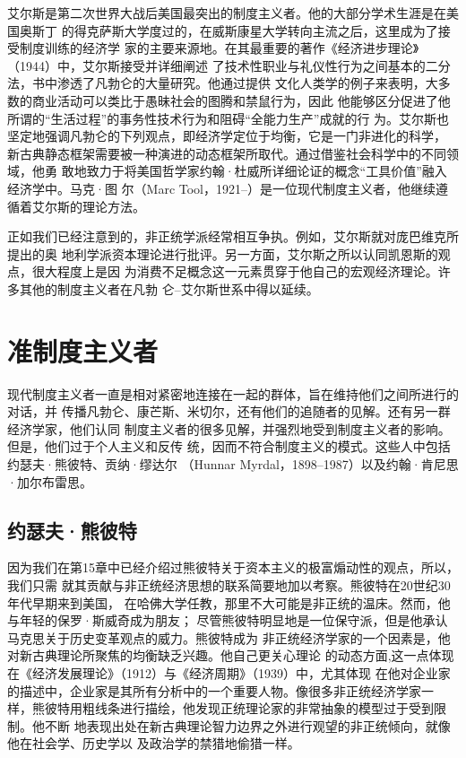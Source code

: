 艾尔斯是第二次世界大战后美国最突出的制度主义者。他的大部分学术生涯是在美国奥斯丁
的得克萨斯大学度过的，在威斯康星大学转向主流之后，这里成为了接受制度训练的经济学
家的主要来源地。在其最重要的著作《经济进步理论》（1944）中，艾尔斯接受并详细阐述
了技术性职业与礼仪性行为之间基本的二分法，书中渗透了凡勃仑的大量研究。他通过提供
文化人类学的例子来表明，大多数的商业活动可以类比于愚昧社会的图腾和禁鼠行为，因此
他能够区分促进了他所谓的“生活过程”的事务性技术行为和阻碍“全能力生产”成就的行
为。艾尔斯也坚定地强调凡勃仑的下列观点，即经济学定位于均衡，它是一门非进化的科学，
新古典静态框架需要被一种演进的动态框架所取代。通过借鉴社会科学中的不同领域，他勇
敢地致力于将美国哲学家约翰·杜威所详细论证的概念“工具价值”融入经济学中。马克·图
尔（Marc Tool，1921--）是一位现代制度主义者，他继续遵循着艾尔斯的理论方法。

正如我们已经注意到的，非正统学派经常相互争执。例如，艾尔斯就对庞巴维克所提出的奥
地利学派资本理论进行批评。另一方面，艾尔斯之所以认同凯恩斯的观点，很大程度上是因
为消费不足概念这一元素贯穿于他自己的宏观经济理论。许多其他的制度主义者在凡勃
仑--艾尔斯世系中得以延续。
\clearpage
\section{准制度主义者}

现代制度主义者一直是相对紧密地连接在一起的群体，旨在维持他们之间所进行的对话，并
传播凡勃仑、康芒斯、米切尔，还有他们的追随者的见解。还有另一群经济学家，他们认同
制度主义者的很多见解，并强烈地受到制度主义者的影响。但是，他们过于个人主义和反传
统，因而不符合制度主义的模式。这些人中包括约瑟夫·熊彼特、贡纳·缪达尔
（Hunnar Myrdal，1898--1987）以及约翰·肯尼思·加尔布雷思。

\subsection{约瑟夫·熊彼特}

因为我们在第15章中已经介绍过熊彼特关于资本主义的极富煽动性的观点，所以，我们只需
就其贡献与非正统经济思想的联系简要地加以考察。熊彼特在20世纪30年代早期来到美国，
在哈佛大学任教，那里不大可能是非正统的温床。然而，他与年轻的保罗·斯威奇成为朋友；
尽管熊彼特明显地是一位保守派，但是他承认马克思关于历史变革观点的威力。熊彼特成为
非正统经济学家的一个因素是，他对新古典理论所聚焦的均衡缺乏兴趣。他自己更关心理论
的动态方面,这一点体现在《经济发展理论》（1912）与《经济周期》（1939）中，尤其体现
在他对企业家的描述中，企业家是其所有分析中的一个重要人物。像很多非正统经济学家一
样，熊彼特用粗线条进行描绘，他发现正统理论家的非常抽象的模型过于受到限制。他不断
地表现出处在新古典理论智力边界之外进行观望的非正统倾向，就像他在社会学、历史学以
及政治学的禁猎地偷猎一样。

